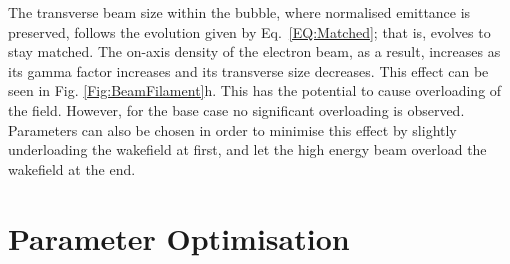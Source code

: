 \documentclass[aps,prstab,reprint,amsmath,amssymb,groupedaddress]{revtex4-1}
\begin{document}
The transverse beam size within the bubble, where normalised emittance is preserved, follows the evolution given by Eq.~\ref{EQ:Matched}; that is, evolves to stay matched. The on-axis density of the electron beam, as a result, increases as its gamma factor increases and its transverse size decreases. This effect can be seen in Fig. \ref{Fig:BeamFilament}h. This has the potential to cause overloading of the field. However, for the base case no significant overloading is observed. Parameters can also be chosen in order to minimise this effect by slightly underloading the wakefield at first, and let the high energy beam overload the wakefield at the end.

\section{Parameter Optimisation}\label{S:PO}
\end{document}
